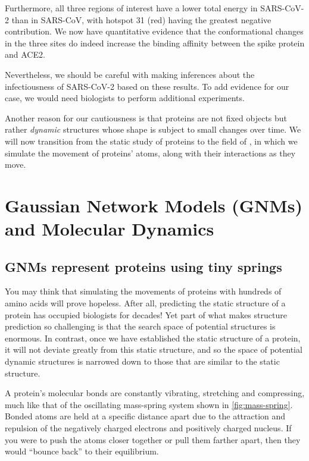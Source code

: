 Furthermore, all three regions of interest have a lower total energy in SARS-CoV-2 than in SARS-CoV, with hotspot 31 (red) having the greatest negative contribution. We now have quantitative evidence that the conformational changes in the three sites do indeed increase the binding affinity between the spike protein and ACE2.

Nevertheless, we should be careful with making inferences about the infectiousness of SARS-CoV-2 based on these results. To add evidence for our case, we would need biologists to perform additional experiments.

Another reason for our cautiousness is that proteins are not fixed objects but rather \textit{dynamic} structures whose shape is subject to small changes over time. We will now transition from the static study of proteins to the field of , in which we simulate the movement of proteins' atoms, along with their interactions as they move.\\

\FloatBarrier
{}

\section{Gaussian Network Models (GNMs) and Molecular Dynamics}
\label{sec:gaussian_network_models}
\subsection{GNMs represent proteins using tiny springs}

You may think that simulating the movements of proteins with hundreds of amino acids will prove hopeless. After all, predicting the static structure of a protein has occupied biologists for decades! Yet part of what makes structure prediction so challenging is that the search space of potential structures is enormous. In contrast, once we have established the static structure of a protein, it will not deviate greatly from this static structure, and so the space of potential dynamic structures is narrowed down to those that are similar to the static structure.

A protein's molecular bonds are constantly vibrating, stretching and compressing, much like that of the oscillating mass-spring system shown in \autoref{fig:mass-spring}. Bonded atoms are held at a specific distance apart due to the attraction and repulsion of the negatively charged electrons and positively charged nucleus. If you were to push the atoms closer together or pull them farther apart, then they would ``bounce back'' to their equilibrium.\\

